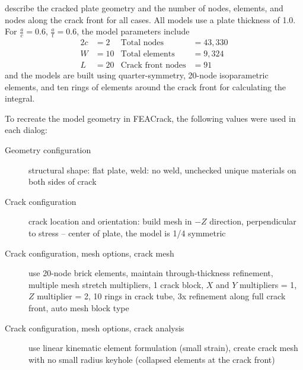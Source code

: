\citeauthor[p.~178]{allenwells2014} describe the cracked plate geometry and the number of nodes, elements, and nodes along the crack front for all cases. All models use a plate thickness of 1.0.
For \(\frac{a}{c}=0.6\), \(\frac{a}{t}=0.6\), the model parameters include
\begin{align*}
2c &= 2 & \text{Total nodes} &= 43,330\\
W &= 10 & \text{Total elements} &= 9,324 \\
L &= 20 & \text{Crack front nodes} &= 91
\end{align*}
and the models are built using quarter-symmetry, 20-node isoparametric elements, and ten rings of elements around the crack front for calculating the \J integral.

To recreate the model geometry in FEACrack, the following values were used in each dialog:

\begin{description}
\item[Geometry configuration] structural shape: flat plate, weld: no weld, unchecked unique materials on both sides of crack
\item[Crack configuration] crack location and orientation: build mesh in \(-Z\) direction, perpendicular to stress -- center of plate, the model is 1/4 symmetric
\item[Crack configuration, mesh options, crack mesh] use 20-node brick elements, maintain through-thickness refinement, multiple mesh stretch multipliers, 1 crack block, \(X\) and \(Y\) multipliers = 1, \(Z\) multiplier = 2, 10 rings in crack tube, 3x refinement along full crack front, auto mesh block type
\item[Crack configuration, mesh options, crack analysis] use linear kinematic element formulation (small strain), create crack mesh with no small radius keyhole (collapsed elements at the crack front)
\end{description}

